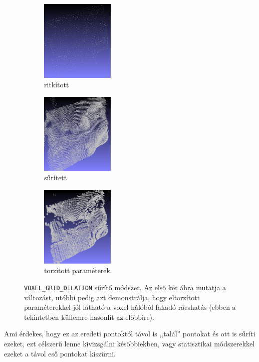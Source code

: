 \documentclass[a4paper,oneside]{article}
\begin{document}
\begin{figure}[tbh]
  \centering
  \begin{subfigure}[b]{.32\linewidth}
	\centering
	\includegraphics[width=100pt]{figs/voxel_up01.png}
	\caption{ritkított \label{fig:upsampling-voxel1}}
  \end{subfigure}%
  \begin{subfigure}[b]{.32\linewidth}
	\centering
	\includegraphics[width=100pt]{figs/voxel_up02.png}
	\caption{sűrített \label{fig:upsampling-voxel2}}
  \end{subfigure}%
  \begin{subfigure}[b]{.32\linewidth}
	\centering
	\includegraphics[width=100pt]{figs/voxel_up03.png}
	\caption{torzított paraméterek \label{fig:upsampling-voxel3}}
  \end{subfigure}%
\caption{\texttt{VOXEL\_GRID\_DILATION} sűrítő módszer. Az első két ábra mutatja a változást, utóbbi pedig azt demonstrálja, hogy eltorzított paraméterekkel jól látható a voxel-hálóból fakadó rácshatás (ebben a tekintetben küllemre hasonlít az előbbire). \label{fig:upsampling-voxel}}
\end{figure}

Ami érdekes, hogy ez az eredeti pontoktól távol is ,,talál'' pontokat és ott is sűríti ezeket, ezt célszerű lenne kivizsgálni későbbiekben, vagy statisztikai módszerekkel ezeket a távol eső pontokat kiszűrni.
\end{document}
